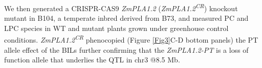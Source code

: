 \documentclass[9pt,twocolumn,twoside]{BioRxiv}
\begin{document}
We then generated a CRISPR-CAS9 \textit{ZmPLA1.2} (\textit{ZmPLA1.2\textsuperscript{CR}}) knockout mutant in B104, a temperate inbred derived from B73, and measured PC and LPC species in WT and mutant plants grown under greenhouse control conditions. 
\textit{ZmPLA1.2\textsuperscript{CR}} phenocopied (Figure \ref{Fig3}C-D bottom panels) the PT allele effect of the BILs further confirming that the \textit{ZmPLA1.2-PT} is a loss of function allele that underlies the QTL in chr3 @8.5 Mb. 
\end{document}
